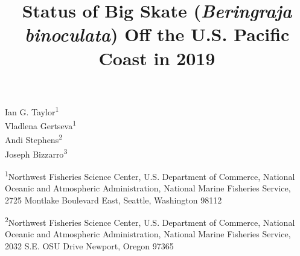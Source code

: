 \documentclass[12pt,]{article}
\title{Status of Big Skate (\emph{Beringraja binoculata}) Off the U.S. Pacific
Coast in 2019}
\author{}
\date{}
\begin{document}
\maketitle


\begin{center}
\thispagestyle{empty}

\vspace{.7cm}


\vspace{.5cm}

Ian G. Taylor\textsuperscript{1}\\
Vladlena Gertseva\textsuperscript{1}\\
Andi Stephens\textsuperscript{2}\\
Joseph Bizzarro\textsuperscript{3}\\


\vspace{.7cm}

\small

\textsuperscript{1}Northwest Fisheries Science Center, U.S. Department of Commerce, National Oceanic and Atmospheric Administration, National Marine Fisheries Service, 2725 Montlake Boulevard East, Seattle, Washington 98112\\

\vspace{.3cm}

\textsuperscript{2}Northwest Fisheries Science Center, U.S. Department of Commerce, National Oceanic and Atmospheric Administration, National Marine Fisheries Service, 2032 S.E. OSU Drive Newport, Oregon 97365


\end{center}
\end{document}
